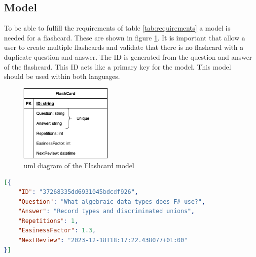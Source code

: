     \subsection*{Model}
    To be able to fulfill the requirements of table \ref{tab:requirements} a model is needed for a flashcard. These are shown in figure \ref{fig:model}. It is important that allow a user to create multiple flashcards and validate that there is no flashcard with a duplicate question and answer. The ID is generated from the question and answer of the flashcard. This ID acts like a primary key for the model. This model should be used within both languages.

    \begin{figure}
        \centering
        \includegraphics[width=0.4\textwidth]{NerddeckModel.png}
        \caption{\ac{uml} diagram of the Flashcard model}\label{fig:model}
    \end{figure}

\begin{lstlisting}[language=json,firstnumber=1,float=tp, caption={Example of how a flashcard is saved inside a \ac{json} file}, label=l:flashcardjson]
[{
    "ID": "37268335dd6931045bdcdf926",
    "Question": "What algebraic data types does F# use?",
    "Answer": "Record types and discriminated unions",
    "Repetitions": 1,
    "EasinessFactor": 1.3,
    "NextReview": "2023-12-18T18:17:22.438077+01:00"
}]   
\end{lstlisting}

